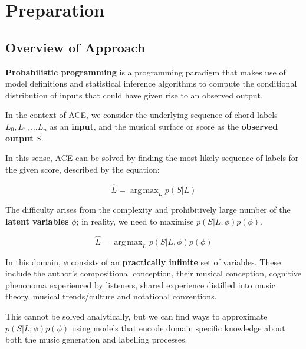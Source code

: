 \documentclass[12pt,a4paper,twoside,openright]{report}
\DeclareMathOperator*{\argmax}{arg\,max}
\theoremstyle{definition}
\begin{document}
\chapter{Preparation}

\section{Overview of Approach}

\textbf{Probabilistic programming} is a programming paradigm that makes use of
model definitions and statistical inference algorithms to compute the
conditional distribution of inputs that could have given rise to an observed
output. 

In the context of ACE, we consider the underlying sequence of chord labels $L_0, L_1,\dots L_n$ as an \textbf{input}, and the musical surface or score as the \textbf{observed output} $S$. 

In this sense, ACE can be solved by finding the most likely sequence of labels for the given score, described by the equation: 

\begin{equation}
  \hat L = \argmax_L p\left(S | L\right)
  \label{eq:aceProbSol}
\end{equation}

The difficulty arises from the complexity and prohibitively large number of the \textbf{latent variables} $\phi$; in reality, we need to maximise $p(S|L,\phi)p(\phi)$.

\begin{equation}
  \hat L = \argmax_L p(S | L,\phi) p(\phi)
  \label{eq:aceProbSolLatent}
\end{equation}

In this domain, $\phi$ consists of an \textbf{practically infinite} set of variables. These include the author's compositional conception, their musical conception, cognitive phenonoma experienced by listeners, shared experience distilled into music theory, musical trends/culture and notational conventions. 

This cannot be solved analytically, but we can find ways to approximate $p(S|L;\phi)p(\phi)$ using models that encode domain specific knowledge about both the music generation and labelling processes. 
\end{document}
